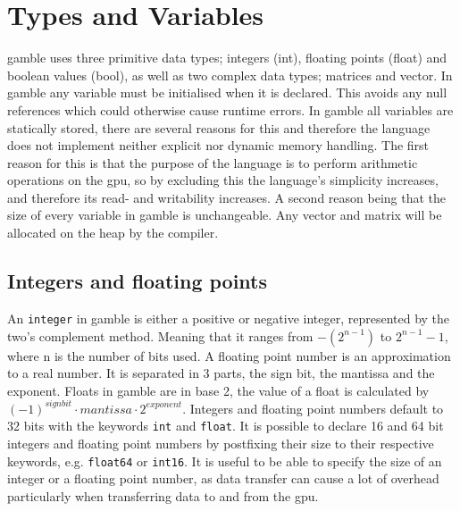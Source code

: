 \section{Types and Variables}\label{sec:Types}
\gls{gamble} uses three primitive data types; integers (int), floating points (float) and boolean values (bool), as well as two complex data types; matrices and vector. 
In \gls{gamble} any variable must be initialised when it is declared. 
This avoids any null references which could otherwise cause runtime errors.
In \gls{gamble} all variables are statically stored, there are several reasons for this and therefore the language does not implement neither explicit nor dynamic memory handling. 
The first reason for this is that the purpose of the language is to perform arithmetic operations on the \acrshort{gpu}, so by excluding this the language's simplicity increases, and therefore its read- and writability increases.
A second reason being that the size of every variable in \gls{gamble} is unchangeable.
Any vector and matrix will be allocated on the heap by the compiler. 

\subsection*{Integers and floating points}
An \texttt{integer} in \gls{gamble} is either a positive or negative integer, represented by the two's complement method. 
Meaning that it ranges from $-(2^{n-1}) $ to $2^{n-1} - 1 $, where n is the number of bits used.
A floating point number is an approximation to a real number. 
It is separated in 3 parts, the sign bit, the mantissa and the exponent. 
Floats in \gls{gamble} are in base 2, the value of a float is calculated by $ {(-1)}^{sign bit} \cdot mantissa \cdot 2^{exponent} $. 
Integers and floating point numbers default to 32 bits with the keywords \texttt{int} and \texttt{float}. 
It is possible to declare 16 and 64 bit integers and floating point numbers by postfixing their size to their respective keywords, e.g. \texttt{float64} or \texttt{int16}. 
It is useful to be able to specify the size of an integer or a floating point number, as data transfer can cause a lot of overhead particularly when transferring data to and from the \acrshort{gpu}. 

